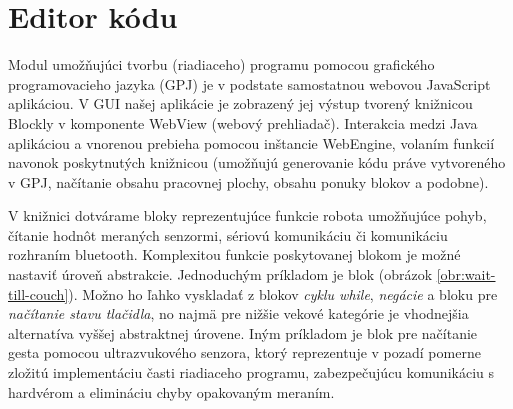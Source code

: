 \section{Editor kódu}
\label{sec:editor-kodu}
Modul umožňujúci tvorbu (riadiaceho) programu pomocou grafického programovacieho jazyka (GPJ) je v podstate samostatnou webovou JavaScript aplikáciou. V GUI našej aplikácie je zobrazený jej výstup tvorený knižnicou Blockly v komponente WebView (webový prehliadač). Interakcia medzi  Java aplikáciou a vnorenou  prebieha pomocou inštancie WebEngine, volaním funkcií navonok poskytnutých knižnicou (umožňujú generovanie kódu práve vytvoreného v GPJ, načítanie obsahu pracovnej plochy, obsahu ponuky blokov a podobne).


V knižnici dotvárame bloky reprezentujúce funkcie robota umožňujúce pohyb, čítanie hodnôt meraných senzormi, sériovú komunikáciu či komunikáciu rozhraním bluetooth. Komplexitou funkcie poskytovanej blokom je možné nastaviť úroveň abstrakcie. Jednoduchým príkladom je blok  (obrázok \ref{obr:wait-till-couch}). Možno ho ľahko vyskladať z blokov \textit{cyklu while}, \textit{negácie} a bloku pre \textit{načítanie stavu tlačidla}, no najmä pre nižšie vekové kategórie je vhodnejšia alternatíva vyššej abstraktnej úrovene. Iným príkladom je blok pre načítanie gesta pomocou ultrazvukového senzora, ktorý reprezentuje v pozadí pomerne zložitú implementáciu časti riadiaceho programu, zabezpečujúcu komunikáciu s hardvérom a elimináciu chyby opakovaným meraním.

